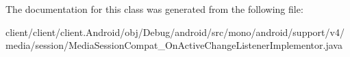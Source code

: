 The documentation for this class was generated from the following file\+:\begin{DoxyCompactItemize}
\item 
client/client/client.\+Android/obj/\+Debug/android/src/mono/android/support/v4/media/session/Media\+Session\+Compat\+\_\+\+On\+Active\+Change\+Listener\+Implementor.\+java\end{DoxyCompactItemize}
